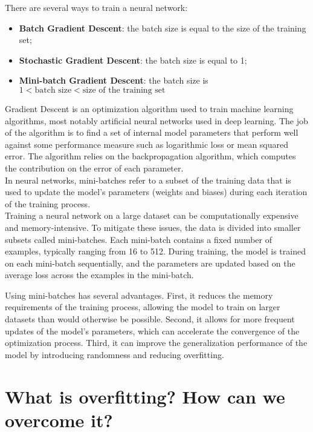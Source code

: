 \documentclass{article}
\begin{document}
There are several ways to train a neural network:

\begin{itemize}
    \item \textbf{Batch Gradient Descent}: the batch size is equal to the size of the training set;
    \item \textbf{Stochastic Gradient Descent}: the batch size is equal to 1;
    \item \textbf{Mini-batch Gradient Descent}: the batch size is $1 < \text{batch size} < \text{size of the training set}$ 
\end{itemize}

Gradient Descent is an optimization algorithm used to train machine learning algorithms, most notably artificial neural networks used in deep learning. The job of the algorithm is to find a set of internal model parameters that perform well against some performance measure such as logarithmic loss or mean squared error. The algorithm relies on the backpropagation algorithm, which computes the contribution on the error of each parameter. \\

In neural networks, mini-batches refer to a subset of the training data that is used to update the model's parameters (weights and biases) during each iteration of the training process. \\

Training a neural network on a large dataset can be computationally expensive and memory-intensive. To mitigate these issues, the data is divided into smaller subsets called mini-batches. Each mini-batch contains a fixed number of examples, typically ranging from 16 to 512. During training, the model is trained on each mini-batch sequentially, and the parameters are updated based on the average loss across the examples in the mini-batch.

Using mini-batches has several advantages. First, it reduces the memory requirements of the training process, allowing the model to train on larger datasets than would otherwise be possible. Second, it allows for more frequent updates of the model's parameters, which can accelerate the convergence of the optimization process. Third, it can improve the generalization performance of the model by introducing randomness and reducing overfitting.

\newpage

\section*{What is overfitting? How can we overcome it?}
\end{document}
